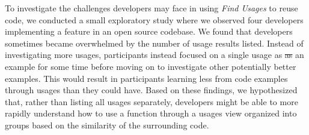 \documentclass[conference]{IEEEtran}
\providecommand{\DIFdel}[1]{{\protect\color{red}\sout{#1}}}                      %
\providecommand{\DIFdelbegin}{} %
\providecommand{\DIFdelend}{} %
\newcommand{\DIFscaledelfig}{0.5}
\newlength{\DIFdelgraphicswidth} %
\newlength{\DIFdelgraphicsheight} %
\newcommand{\DIFdelincludegraphics}[2][]{%
\sbox{\DIFdelgraphicsbox}{\DIFOincludegraphics[#1]{#2}}%
\settoboxwidth{\DIFdelgraphicswidth}{\DIFdelgraphicsbox} %
\settoboxtotalheight{\DIFdelgraphicsheight}{\DIFdelgraphicsbox} %
\scalebox{\DIFscaledelfig}{%
\parbox[b]{\DIFdelgraphicswidth}{\usebox{\DIFdelgraphicsbox}\\[-\baselineskip] \rule{\DIFdelgraphicswidth}{0em}}\llap{\resizebox{\DIFdelgraphicswidth}{\DIFdelgraphicsheight}{%
\setlength{\unitlength}{\DIFdelgraphicswidth}%
\begin{picture}(1,1)%
\thicklines\linethickness{2pt} %
{\color[rgb]{1,0,0}\put(0,0){\framebox(1,1){}}}%
{\color[rgb]{1,0,0}\put(0,0){\line( 1,1){1}}}%
{\color[rgb]{1,0,0}\put(0,1){\line(1,-1){1}}}%
\end{picture}%
}\hspace*{3pt}}} %
} %
\DeclareRobustCommand{\DIFdelbegin}{\DIFOdelbegin \let\includegraphics\DIFdelincludegraphics} %
\DeclareRobustCommand{\DIFdelend}{\DIFOaddend \let\includegraphics\DIFOincludegraphics} %
\begin{document}



To investigate the challenges developers may face in using \textit{Find Usages} to reuse code, we conducted a small exploratory study where we observed four developers implementing a feature in an open source codebase. We found that developers sometimes became overwhelmed by the number of usage results listed. Instead of investigating more usages, participants instead focused on a single usage as \DIFdelbegin \DIFdel{as }\DIFdelend an example for some time before moving on to investigate other potentially better examples. This would result in participants learning less from code examples through usages than they could have.
Based on these findings, we hypothesized that, rather than listing all usages separately, developers might be able to more rapidly understand how to use a function through a usages view organized into groups based on the similarity of the surrounding code. \par
\end{document}
